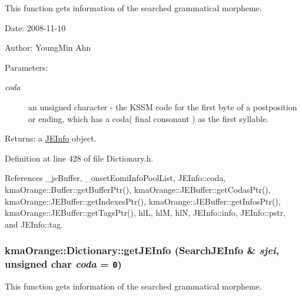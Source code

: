 This function gets information of the searched grammatical morpheme. 

\begin{Desc}
\item[Date:]2008-11-10 \end{Desc}
\begin{Desc}
\item[Author:]YoungMin Ahn \end{Desc}
\begin{Desc}
\item[Parameters:]
\begin{description}
\item[{\em coda}]an unsigned character - the KSSM code for the first byte of a postposition or ending, which has a coda( final consonant ) as the first syllable. \end{description}
\end{Desc}
\begin{Desc}
\item[Returns:]a \hyperlink{classJEInfo}{JEInfo} object. \end{Desc}


Definition at line 428 of file Dictionary.h.

References \_\-jeBuffer, \_\-onsetEomiInfoPoolList, JEInfo::coda, kmaOrange::Buffer::getBufferPtr(), kmaOrange::JEBuffer::getCodasPtr(), kmaOrange::JEBuffer::getIndexesPtr(), kmaOrange::JEBuffer::getInfosPtr(), kmaOrange::JEBuffer::getTagsPtr(), hlL, hlM, hlN, JEInfo::info, JEInfo::pstr, and JEInfo::tag.\hypertarget{classkmaOrange_1_1Dictionary_ff02492cac6fecda2e4fa7c1064752c3}{
\subsubsection[{getJEInfo}]{ kmaOrange::Dictionary::getJEInfo ({\bf SearchJEInfo} \& {\em sjei}, \/  unsigned char {\em coda} = {\tt 0})}}
\label{classkmaOrange_1_1Dictionary_ff02492cac6fecda2e4fa7c1064752c3}


This function gets information of the searched grammatical morpheme. 

